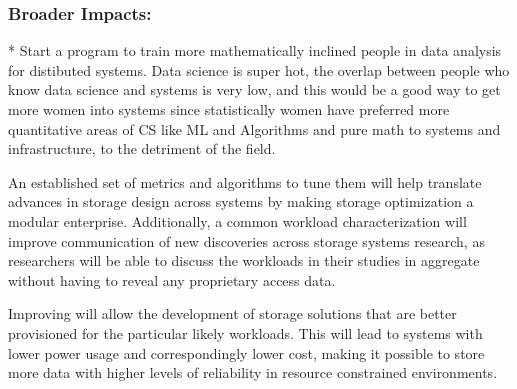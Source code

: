 


\subsubsection*{Broader Impacts: }

* Start a program to train more mathematically inclined people in data analysis
for distibuted systems.  Data science is super hot, the overlap between people
who know data science and systems is very low, and this would be a good way to
get more women into systems since statistically women have preferred more
quantitative areas of CS like ML and Algorithms and pure math to systems and
infrastructure, to the detriment of the field.

An established set of metrics and algorithms to tune them will help translate advances in storage
design across systems by making storage optimization a modular enterprise.
Additionally, a common workload characterization will improve communication of
new discoveries across storage systems research, as researchers will be able to
discuss the workloads in their studies in aggregate without having to
reveal any proprietary access data.

Improving \systemfit will allow the development of storage solutions that are
better provisioned for the particular likely workloads.
This will lead to systems with lower power usage and correspondingly lower cost,
making it possible to store more data with higher levels of reliability in
resource constrained environments.

